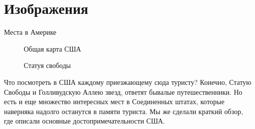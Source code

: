 \documentclass[a4paper,12pt]{article}
\begin{document}
	\section{Изображения} 
	\label{s1}
Места в Америке
	\begin{figure}[h] 
		\caption{Общая карта США}
		\label{f1}
	\end{figure}
	\begin{figure}[b] 
		\caption{Статуя свободы}
		\label{f2}
	\end{figure}
Что посмотреть в США каждому приезжающему сюда туристу? Конечно, Статую Свободы и Голливудскую Аллею звезд, ответят бывалые путешественники. Но есть и еще множество интересных мест в Соединенных штатах, которые наверняка надолго останутся в памяти туриста. Мы же сделали краткий обзор, где описали основные достопримечательности США.
\end{document}
